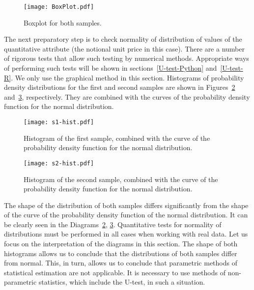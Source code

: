 \documentclass[]{scrreprt}
\begin{document}
%
\begin{figure}[htp]
	\centering
	\texttt{[image: BoxPlot.pdf]}
	\caption{Boxplot for both samples.}
	\label{fig:BoxPlot-LO}
\end{figure}
%
The next preparatory step is to check normality of distribution of values of the quantitative attribute (the notional unit price in this case). There are a number of rigorous tests that allow such testing by numerical methods. Appropriate ways of performing such tests will be shown in sections~\ref{U-test-Python} and~\ref{U-test-R}. We only use the graphical method in this section. Histograms of probability density distributions for the first and second samples are shown in Figures~\ref{fig:s1-hist} and~\ref{fig:s2-hist}, respectively. They are combined with the curves of the probability density function for the normal distribution.
%
\begin{figure}[htp]
	\centering
	\texttt{[image: s1-hist.pdf]}
	\caption{Histogram of the first sample, combined with the curve of the probability density function for the normal distribution.}
	\label{fig:s1-hist}
\end{figure}
%
\begin{figure}[htp]
	\centering
	\texttt{[image: s2-hist.pdf]}
	\caption{Histogram of the second sample, combined with the curve of the probability density function for the normal distribution.}
	\label{fig:s2-hist}
\end{figure}
%

The shape of the distribution of both samples differs significantly from the shape of the curve of the probability density function of the normal distribution. It can be clearly seen in the Diagrams~\ref{fig:s1-hist}, \ref{fig:s2-hist}. Quantitative tests for normality of distributions must be performed in all cases when working with real data. Let us focus on the interpretation of the diagrams in this section. The shape of both histograms allows us to conclude that the distributions of both samples differ from normal. This, in turn, allows us to conclude that parametric methods of statistical estimation are not applicable. It is necessary to use methods of non-parametric statistics, which include the U-test, in such a situation.
\end{document}

